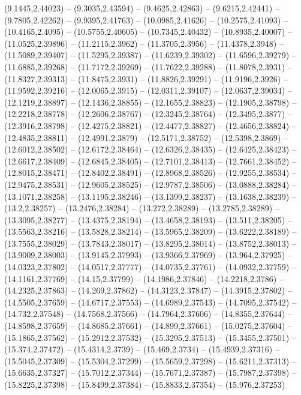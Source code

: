 {(9.1445,2.44023) -- (9.3035,2.43594) -- (9.4625,2.42863) -- (9.6215,2.42441) -- (9.7805,2.42262) -- (9.9395,2.41763) -- (10.0985,2.41626) -- (10.2575,2.41093) -- (10.4165,2.4095) -- (10.5755,2.40605) -- (10.7345,2.40432) -- (10.8935,2.40007) --
(11.0525,2.39896) -- (11.2115,2.3962) -- (11.3705,2.3956) -- (11.4378,2.3948) -- (11.5089,2.39407) -- (11.5295,2.39387) -- (11.6239,2.39302) -- (11.6596,2.39279) -- (11.6885,2.39268) -- (11.7172,2.39269) -- (11.7622,2.39288) -- (11.8078,2.3931) -- (11.8327,2.39313)
-- (11.8475,2.3931) -- (11.8826,2.39291) -- (11.9196,2.3926) -- (11.9592,2.39216) -- (12.0065,2.3915) -- (12.0311,2.39107) -- (12.0637,2.39034) -- (12.1219,2.38897) -- (12.1436,2.38855) -- (12.1655,2.38823) -- (12.1905,2.38798) -- (12.2218,2.38778)
-- (12.2606,2.38767) -- (12.3245,2.38764) -- (12.3495,2.3877) -- (12.3916,2.38798) -- (12.4275,2.38821) -- (12.4477,2.38827) -- (12.4656,2.38824) -- (12.4835,2.38811) -- (12.4991,2.3879) -- (12.5171,2.38752) -- (12.5398,2.3869) -- (12.6012,2.38502)
-- (12.6172,2.38464) -- (12.6326,2.38435) -- (12.6425,2.38423) -- (12.6617,2.38409) -- (12.6845,2.38405) -- (12.7101,2.38413) -- (12.7661,2.38452) -- (12.8015,2.38471) -- (12.8402,2.38491) -- (12.8968,2.38526) -- (12.9255,2.38534) --
(12.9475,2.38531) -- (12.9605,2.38525) -- (12.9787,2.38506) -- (13.0888,2.38284) -- (13.1071,2.38258) -- (13.1195,2.38246) -- (13.1399,2.38237) -- (13.1638,2.38239) -- (13.2,2.38257) -- (13.2476,2.38284) -- (13.272,2.38289) -- (13.2785,2.38289) --
(13.3095,2.38277) -- (13.4375,2.38194) -- (13.4658,2.38193) -- (13.511,2.38205) -- (13.5563,2.38216) -- (13.5828,2.38214) -- (13.5965,2.38209) -- (13.6222,2.38189) -- (13.7555,2.38029) -- (13.7843,2.38017) -- (13.8295,2.38014) -- (13.8752,2.38013)
-- (13.9009,2.38003) -- (13.9145,2.37993) -- (13.9366,2.37969) -- (13.964,2.37925) -- (14.0323,2.37802) -- (14.0517,2.37777) -- (14.0735,2.37761) -- (14.0932,2.37759) -- (14.1161,2.37769) -- (14.15,2.37799) -- (14.1986,2.37846) -- (14.2218,2.3786)
-- (14.2325,2.37863) -- (14.269,2.37862) -- (14.3123,2.37847) -- (14.3915,2.37802) -- (14.5505,2.37659) -- (14.6717,2.37553) -- (14.6989,2.37543) -- (14.7095,2.37542) -- (14.732,2.37548) -- (14.7568,2.37566) -- (14.7964,2.37606) -- (14.8355,2.37644)
-- (14.8598,2.37659) -- (14.8685,2.37661) -- (14.899,2.37661) -- (15.0275,2.37604) -- (15.1865,2.37562) -- (15.2912,2.37532) -- (15.3295,2.37513) -- (15.3455,2.37501) -- (15.374,2.37472) -- (15.4314,2.3739) -- (15.469,2.3734) -- (15.4939,2.37316) --
(15.5045,2.37309) -- (15.5304,2.37299) -- (15.5659,2.37298) -- (15.6211,2.37313) -- (15.6635,2.37327) -- (15.7012,2.37344) -- (15.7671,2.37387) -- (15.7987,2.37398) -- (15.8225,2.37398) -- (15.8499,2.37384) -- (15.8833,2.37354) -- (15.976,2.37253)
}

